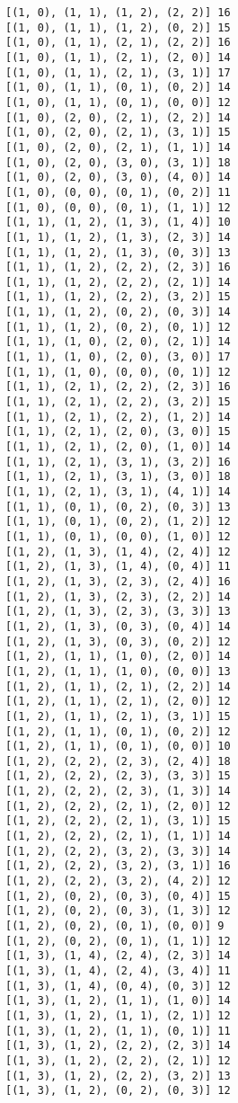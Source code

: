 \documentclass[11pt]{article}
\begin{document}
\begin{Verbatim}[commandchars=\\\{\}]
[(1, 0), (1, 1), (1, 2), (2, 2)] 16
[(1, 0), (1, 1), (1, 2), (0, 2)] 15
[(1, 0), (1, 1), (2, 1), (2, 2)] 16
[(1, 0), (1, 1), (2, 1), (2, 0)] 14
[(1, 0), (1, 1), (2, 1), (3, 1)] 17
[(1, 0), (1, 1), (0, 1), (0, 2)] 14
[(1, 0), (1, 1), (0, 1), (0, 0)] 12
[(1, 0), (2, 0), (2, 1), (2, 2)] 14
[(1, 0), (2, 0), (2, 1), (3, 1)] 15
[(1, 0), (2, 0), (2, 1), (1, 1)] 14
[(1, 0), (2, 0), (3, 0), (3, 1)] 18
[(1, 0), (2, 0), (3, 0), (4, 0)] 14
[(1, 0), (0, 0), (0, 1), (0, 2)] 11
[(1, 0), (0, 0), (0, 1), (1, 1)] 12
[(1, 1), (1, 2), (1, 3), (1, 4)] 10
[(1, 1), (1, 2), (1, 3), (2, 3)] 14
[(1, 1), (1, 2), (1, 3), (0, 3)] 13
[(1, 1), (1, 2), (2, 2), (2, 3)] 16
[(1, 1), (1, 2), (2, 2), (2, 1)] 14
[(1, 1), (1, 2), (2, 2), (3, 2)] 15
[(1, 1), (1, 2), (0, 2), (0, 3)] 14
[(1, 1), (1, 2), (0, 2), (0, 1)] 12
[(1, 1), (1, 0), (2, 0), (2, 1)] 14
[(1, 1), (1, 0), (2, 0), (3, 0)] 17
[(1, 1), (1, 0), (0, 0), (0, 1)] 12
[(1, 1), (2, 1), (2, 2), (2, 3)] 16
[(1, 1), (2, 1), (2, 2), (3, 2)] 15
[(1, 1), (2, 1), (2, 2), (1, 2)] 14
[(1, 1), (2, 1), (2, 0), (3, 0)] 15
[(1, 1), (2, 1), (2, 0), (1, 0)] 14
[(1, 1), (2, 1), (3, 1), (3, 2)] 16
[(1, 1), (2, 1), (3, 1), (3, 0)] 18
[(1, 1), (2, 1), (3, 1), (4, 1)] 14
[(1, 1), (0, 1), (0, 2), (0, 3)] 13
[(1, 1), (0, 1), (0, 2), (1, 2)] 12
[(1, 1), (0, 1), (0, 0), (1, 0)] 12
[(1, 2), (1, 3), (1, 4), (2, 4)] 12
[(1, 2), (1, 3), (1, 4), (0, 4)] 11
[(1, 2), (1, 3), (2, 3), (2, 4)] 16
[(1, 2), (1, 3), (2, 3), (2, 2)] 14
[(1, 2), (1, 3), (2, 3), (3, 3)] 13
[(1, 2), (1, 3), (0, 3), (0, 4)] 14
[(1, 2), (1, 3), (0, 3), (0, 2)] 12
[(1, 2), (1, 1), (1, 0), (2, 0)] 14
[(1, 2), (1, 1), (1, 0), (0, 0)] 13
[(1, 2), (1, 1), (2, 1), (2, 2)] 14
[(1, 2), (1, 1), (2, 1), (2, 0)] 12
[(1, 2), (1, 1), (2, 1), (3, 1)] 15
[(1, 2), (1, 1), (0, 1), (0, 2)] 12
[(1, 2), (1, 1), (0, 1), (0, 0)] 10
[(1, 2), (2, 2), (2, 3), (2, 4)] 18
[(1, 2), (2, 2), (2, 3), (3, 3)] 15
[(1, 2), (2, 2), (2, 3), (1, 3)] 14
[(1, 2), (2, 2), (2, 1), (2, 0)] 12
[(1, 2), (2, 2), (2, 1), (3, 1)] 15
[(1, 2), (2, 2), (2, 1), (1, 1)] 14
[(1, 2), (2, 2), (3, 2), (3, 3)] 14
[(1, 2), (2, 2), (3, 2), (3, 1)] 16
[(1, 2), (2, 2), (3, 2), (4, 2)] 12
[(1, 2), (0, 2), (0, 3), (0, 4)] 15
[(1, 2), (0, 2), (0, 3), (1, 3)] 12
[(1, 2), (0, 2), (0, 1), (0, 0)] 9
[(1, 2), (0, 2), (0, 1), (1, 1)] 12
[(1, 3), (1, 4), (2, 4), (2, 3)] 14
[(1, 3), (1, 4), (2, 4), (3, 4)] 11
[(1, 3), (1, 4), (0, 4), (0, 3)] 12
[(1, 3), (1, 2), (1, 1), (1, 0)] 14
[(1, 3), (1, 2), (1, 1), (2, 1)] 12
[(1, 3), (1, 2), (1, 1), (0, 1)] 11
[(1, 3), (1, 2), (2, 2), (2, 3)] 14
[(1, 3), (1, 2), (2, 2), (2, 1)] 12
[(1, 3), (1, 2), (2, 2), (3, 2)] 13
[(1, 3), (1, 2), (0, 2), (0, 3)] 12

\end{Verbatim}
\end{document}
